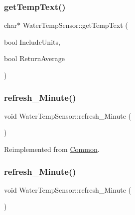 \subsubsection{\texorpdfstring{get\+Temp\+Text()}{getTempText()}\hspace{0.1cm}{\footnotesize\ttfamily [2/2]}}
{\footnotesize\ttfamily char$\ast$ Water\+Temp\+Sensor\+::get\+Temp\+Text (\begin{DoxyParamCaption}\item[{bool}]{Include\+Units,  }\item[{bool}]{Return\+Average }\end{DoxyParamCaption})}

\mbox{\label{class_water_temp_sensor_ad3b641c41aea8f28b5b1640e16e2ccde}} 
\subsubsection{\texorpdfstring{refresh\+\_\+\+Minute()}{refresh\_Minute()}\hspace{0.1cm}{\footnotesize\ttfamily [1/2]}}
{\footnotesize\ttfamily void Water\+Temp\+Sensor\+::refresh\+\_\+\+Minute (\begin{DoxyParamCaption}{ }\end{DoxyParamCaption})\hspace{0.3cm}{\ttfamily [virtual]}}



Reimplemented from \hyperlink{class_common_a14e4462a94bd118028ce1d487ca0292c}{Common}.

\mbox{\label{class_water_temp_sensor_ad3b641c41aea8f28b5b1640e16e2ccde}} 
\subsubsection{\texorpdfstring{refresh\+\_\+\+Minute()}{refresh\_Minute()}\hspace{0.1cm}{\footnotesize\ttfamily [2/2]}}
{\footnotesize\ttfamily void Water\+Temp\+Sensor\+::refresh\+\_\+\+Minute (\begin{DoxyParamCaption}{ }\end{DoxyParamCaption})\hspace{0.3cm}{\ttfamily [virtual]}}



